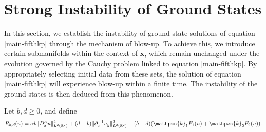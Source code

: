 \documentclass[10pt]{article}
\numberwithin{equation}{section}
\newcommand{\ps}{\mathpzc{k}}
\newcommand{\lt}{{L^2(\mathbb{R}^2)}}
\newcommand{\nd}{{\partial_x^{-1}}}
\newcommand{\dx}{D_x^{\alpha}}
\newcommand{\al}{\alpha}
\newcommand{\rrr}{{R_{b,d}}}
\begin{document}
	\section{Strong Instability of Ground States}\label{sect-strong-inst}
	In this section, we establish the instability of ground state solutions of equation \eqref{main-fifthkp} through the mechanism of blow-up. To achieve this, we introduce certain submanifolds within the context of $\mathbf{x}$, which remain unchanged under the evolution governed by the Cauchy problem linked to equation \eqref{main-fifthkp}. By appropriately selecting initial data from these sets, the solution of equation \eqref{main-fifthkp} will experience blow-up within a finite time. The instability of the ground states is then deduced from this phenomenon.
	
	
	Let $b,d\geq0$, and define 
	\[
	\rrr(u)=\al b\|\dx u\|_\lt^2 + (d-b)\|\nd u_y\|_\lt^2
	-(b+d)(\ps_1F_1(u)
	+\ps_2 F_2(u)).
	\]
	
\end{document}
